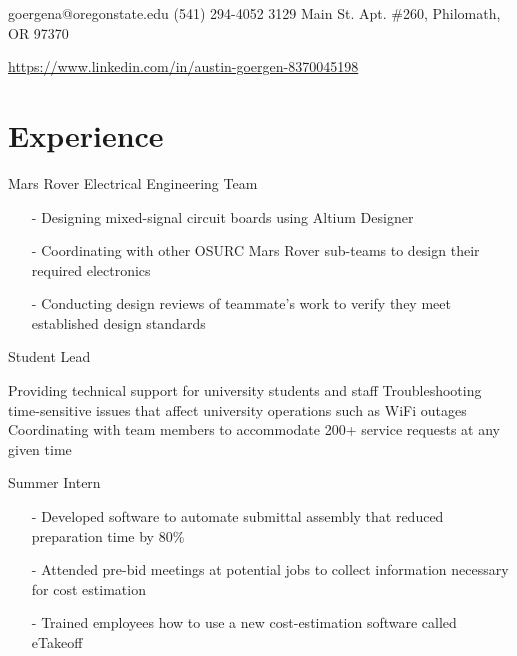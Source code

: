 \documentclass{my_cv}
\begin{document}

\contact
{goergena@oregonstate.edu}
{(541) 294-4052}
{3129 Main St. Apt. \#260, Philomath, OR 97370}

\vspace{-0.5em}

\begin{center}
\href{https://www.linkedin.com/in/austin-goergen-8370045198}{https://www.linkedin.com/in/austin-goergen-8370045198}
\end{center}

\section{Experience}

\vspace{-0.75em}
Mars Rover Electrical Engineering Team

\vspace{-0.5em}
\begin{itemize}
    \item[-] Designing mixed-signal circuit boards using Altium Designer
    \vspace{-0.75em}
    
    \item[-] Coordinating with other OSURC Mars Rover sub-teams to design their required electronics
    \vspace{-0.75em}
    
    \item[-] Conducting design reviews of teammate's work to verify they meet established design standards
    \vspace{-0.75em}
\end{itemize}

\vspace{-0.75em}
Student Lead

\workitems
{Providing technical support for university students and staff}
{Troubleshooting time-sensitive issues that affect university operations such as WiFi outages}
{Coordinating with team members to accommodate 200+ service requests at any given time}

\vspace{-0.75em}
Summer Intern
\vspace{-0.5em}
\begin{itemize}
    \item[-] Developed software to automate submittal assembly that reduced preparation time by 80\%
    \vspace{-0.75em}
    
    \item[-] Attended pre-bid meetings at potential jobs to collect information necessary for cost estimation
    \vspace{-0.75em}
    
    \item[-] Trained employees how to use a new cost-estimation software called eTakeoff
\end{itemize}
\end{document}
